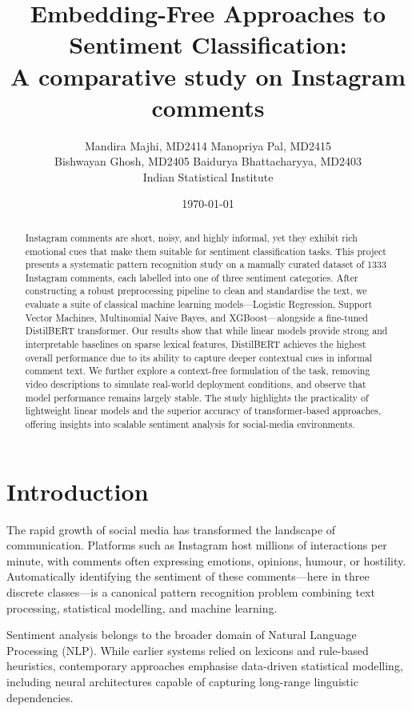 \documentclass[11pt,a4paper]{article}
\title{
\textbf{\Large Embedding-Free Approaches to Sentiment Classification:\\
A comparative study on Instagram comments}
}
\author{
Mandira Majhi, MD2414 \quad
Manopriya Pal, MD2415 \\
Bishwayan Ghosh, MD2405 \quad
Baidurya Bhattacharyya, MD2403 \\
\normalsize Indian Statistical Institute
}
\date{\today}
\begin{document}
\maketitle

\begin{abstract}
Instagram comments are short, noisy, and highly informal, yet they exhibit rich emotional cues that make them suitable for sentiment classification tasks. This project presents a systematic pattern recognition study on a manually curated dataset of 1333 Instagram comments, each labelled into one of three sentiment categories. After constructing a robust preprocessing pipeline to clean and standardise the text, we evaluate a suite of classical machine learning models—Logistic Regression, Support Vector Machines, Multinomial Naive Bayes, and XGBoost—alongside a fine-tuned DistilBERT transformer. Our results show that while linear models provide strong and interpretable baselines on sparse lexical features, DistilBERT achieves the highest overall performance due to its ability to capture deeper contextual cues in informal comment text. We further explore a context-free formulation of the task, removing video descriptions to simulate real-world deployment conditions, and observe that model performance remains largely stable. The study highlights the practicality of lightweight linear models and the superior accuracy of transformer-based approaches, offering insights into scalable sentiment analysis for social-media environments.
\end{abstract}

\tableofcontents

\section{Introduction}
The rapid growth of social media has transformed the landscape of communication. Platforms such as Instagram host millions of interactions per minute, with comments often expressing emotions, opinions, humour, or hostility. Automatically identifying the sentiment of these comments---here in three discrete classes---is a canonical pattern recognition problem combining text processing, statistical modelling, and machine learning.

Sentiment analysis belongs to the broader domain of Natural Language Processing (NLP). While earlier systems relied on lexicons and rule-based heuristics, contemporary approaches emphasise data-driven statistical modelling, including neural architectures capable of capturing long-range linguistic dependencies.
\end{document}
